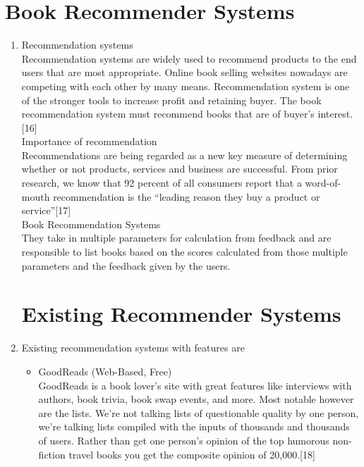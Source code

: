 \documentclass[a4paper,12pt]{report}
\begin{document}
  \section{Book Recommender Systems }
  \begin{enumerate} %
  \item Recommendation systems\\
        Recommendation systems are widely used to recommend products to the end users that are most appropriate. Online book selling websites nowadays are competing with each other by many means. Recommendation system is one of the stronger tools to increase profit and retaining buyer. The book recommendation system must recommend books that are of buyer’s interest.[16]\\
        Importance of recommendation\\
        Recommendations are being regarded as a new key measure of determining whether or not products, services and business are successful. From prior research, we know that 92 percent of all consumers report that a word-of-mouth recommendation is the “leading reason they buy a product or service”[17]\\
        Book Recommendation Systems \\
        They take in multiple parameters for calculation from feedback and are responsible to list books based on the scores calculated from those multiple parameters and the feedback given by the users. \\

  \section{Existing Recommender Systems}
    \item Existing recommendation systems with features are \\
    \begin{itemize} %
      \item GoodReads (Web-Based, Free)\\
            GoodReads is a book lover's site with great features like interviews with authors, book trivia, book swap events, and more. Most notable however are the lists. We're not talking lists of questionable quality by one person, we're talking lists compiled with the inputs of thousands and thousands of users. Rather than get one person's opinion of the top humorous non-fiction travel books you get the composite opinion of 20,000.[18]\\


\end{itemize}
\end{enumerate}
\end{document}

